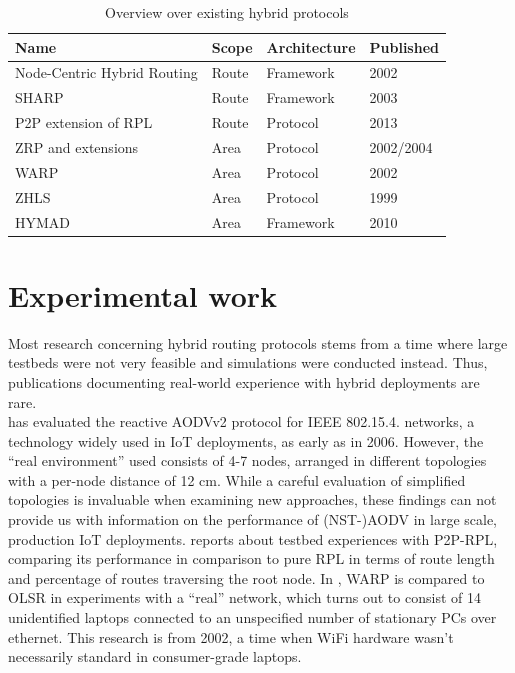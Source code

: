 \documentclass[a4paper,10pt]{scrartcl}
\begin{document}
\begin{table}[t]
    \begin{tabular}{p{}|l|l|l}
        Name & Scope & Architecture & Published \\
        \hline
        Node-Centric Hybrid Routing \cite{Roy_nodecentric} & Route & Framework & 2002 \\ %
        \gls{SHARP}\cite{SHARP} & Route & Framework & 2003 \\ %
        P2P extension\cite{RFC-6997} of RPL\cite{RFC-6550} & Route & Protocol & 2013\\
        \gls{ZRP} \cite{ZRP-Draft} and extensions \cite{TZRP} \cite{IZR} & Area & Protocol & 2002/2004\\
        \gls{WARP}\cite{WARP} & Area & Protocol & 2002\\
        \gls{ZHLS}\cite{ZHLS} & Area & Protocol & 1999\\
        \gls{HYMAD}\cite{HYMAD} & Area & Framework & 2010\\ %
    \end{tabular}
    \caption{Overview over existing hybrid protocols}
    \label{fig:overview}
\end{table}

\section{Experimental work}
\label{sec:experiments}
Most research concerning hybrid routing protocols stems from a time where large testbeds were not very feasible and simulations were conducted instead.  Thus, publications documenting real-world experience with hybrid deployments are rare.\\

\cite{gomez_NSTAODV_eval} has evaluated the reactive AODVv2 protocol for IEEE 802.15.4. networks, a technology widely used in IoT deployments, as early as in 2006. However, the ``real environment'' used consists of 4-7 nodes, arranged in different topologies with a per-node distance of 12 cm. While a careful evaluation of simplified topologies is invaluable when examining new approaches, these findings can not provide us with information on the performance of (NST-)AODV in large scale, production IoT deployments.
\cite{baccelli_p2p_prl} reports about testbed experiences with P2P-RPL, comparing its performance in comparison to pure RPL in terms of route length and percentage of routes traversing the root node.
In \cite{WARP}, WARP is compared to OLSR in experiments with a ``real'' network, which turns out to consist of 14 unidentified laptops connected to an unspecified number of stationary PCs over ethernet. This research is from 2002, a time when WiFi hardware wasn't necessarily standard in consumer-grade laptops.\\
\end{document}
